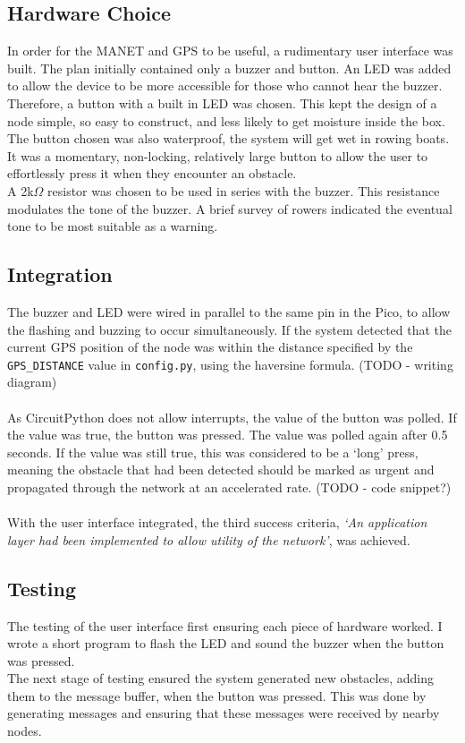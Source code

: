 \documentclass[12pt,a4paper]{report}
\begin{document}
\subsection{Hardware Choice}
In order for the MANET and GPS to be useful, a rudimentary user interface was built. The plan initially contained only a buzzer and button. An LED was added to allow the device to be more accessible for those who cannot hear the buzzer. 
Therefore, a button with a built in LED was chosen. This kept the design of a node simple, so easy to construct, and less likely to get moisture inside the box. The button chosen was also waterproof, the system will get wet in rowing boats. It was a momentary, non-locking, relatively large button to allow the user to effortlessly press it when they encounter an obstacle. \\
A 2k$\Omega$ resistor was chosen to be used in series with the buzzer. This resistance modulates the tone of the buzzer. A brief survey of rowers indicated the eventual tone to be most suitable as a warning. 

\subsection{Integration}
The buzzer and LED were wired in parallel to the same pin in the Pico, to allow the flashing and buzzing to occur simultaneously. If the system detected that the current GPS position of the node was within the distance specified by the \verb'GPS_DISTANCE' value in \verb'config.py', using the haversine formula. (TODO - writing diagram) \\ \\ 
As CircuitPython does not allow interrupts, the value of the button was polled. If the value was true, the button was pressed. The value was polled again after 0.5 seconds. If the value was still true, this was considered to be a `long' press, meaning the obstacle that had been detected should be marked as urgent and propagated through the network at an accelerated rate. (TODO - code snippet?) \\ \\
With the user interface integrated, the third success criteria, \emph{`An application layer had been implemented to allow utility of the network'}, was achieved. 

\subsection{Testing}
The testing of the user interface first ensuring each piece of hardware worked. I wrote a short program to flash the LED and sound the buzzer when the button was pressed. \\
The next stage of testing ensured the system generated new obstacles, adding them to the message buffer, when the button was pressed. This was done by generating messages and ensuring that these messages were received by nearby nodes. 
\end{document}
